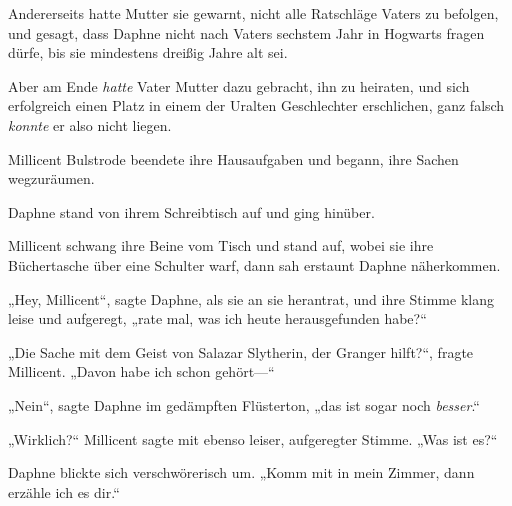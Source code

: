 Andererseits hatte Mutter sie gewarnt, nicht alle Ratschläge Vaters zu befolgen, und gesagt, dass Daphne nicht nach Vaters sechstem Jahr in Hogwarts fragen dürfe, bis sie mindestens dreißig Jahre alt sei.

Aber am Ende \emph{hatte} Vater Mutter dazu gebracht, ihn zu heiraten, und sich erfolgreich einen Platz in einem der Uralten Geschlechter erschlichen, ganz falsch \emph{konnte} er also nicht liegen.

Millicent Bulstrode beendete ihre Hausaufgaben und begann, ihre Sachen wegzuräumen.

Daphne stand von ihrem Schreibtisch auf und ging hinüber.

Millicent schwang ihre Beine vom Tisch und stand auf, wobei sie ihre Büchertasche über eine Schulter warf, dann sah erstaunt Daphne näherkommen.

„Hey, Millicent“, sagte Daphne, als sie an sie herantrat, und ihre Stimme klang leise und aufgeregt, „rate mal, was ich heute herausgefunden habe?“

„Die Sache mit dem Geist von Salazar Slytherin, der Granger hilft?“, fragte Millicent. „Davon habe ich schon gehört—“

„Nein“, sagte Daphne im gedämpften Flüsterton, „das ist sogar noch \emph{besser}.“

„Wirklich?“ Millicent sagte mit ebenso leiser, aufgeregter Stimme. „Was ist es?“

Daphne blickte sich verschwörerisch um. „Komm mit in mein Zimmer, dann erzähle ich es dir.“

